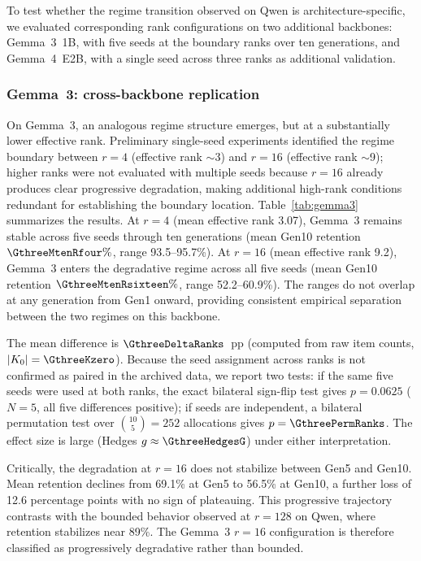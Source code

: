 \documentclass[a4paper,fleqn]{cas-dc}
\newif\ifshowchanges
\newcommand{\rev}[1]{\ifshowchanges{\color{blue}#1}\else{#1}\fi}
\begin{document}
To test whether the regime transition observed on Qwen is architecture-specific,
we evaluated corresponding rank configurations on two additional backbones:
Gemma~3~1B, with five seeds at the boundary ranks over ten generations, and
Gemma~4~E2B, with a single seed across three ranks as additional validation.

\subsubsection{Gemma~3: cross-backbone replication}

On Gemma~3, an analogous regime structure emerges, but at a substantially lower
effective rank. Preliminary single-seed experiments identified the regime
boundary between $r=4$ (effective rank ${\sim}$3) and $r=16$ (effective rank
${\sim}$9); higher ranks were not evaluated with multiple seeds because $r=16$
already produces clear progressive degradation, making additional high-rank
conditions redundant for establishing the boundary location.
Table~\ref{tab:gemma3} summarizes the results. At $r=4$ (mean
effective rank 3.07), Gemma~3 remains stable across five seeds through ten
generations (mean Gen10 retention \rev{$\GthreeMtenRfour\%$, range 93.5--95.7\%}).
At $r=16$ (mean effective rank 9.2), Gemma~3 enters the degradative regime
across all five seeds (mean Gen10 retention \rev{$\GthreeMtenRsixteen\%$,
range 52.2--60.9\%}). The ranges do not
overlap at any generation from Gen1 onward, providing consistent empirical
separation between the two regimes on this backbone.

\rev{The mean difference is $\GthreeDeltaRanks$~pp (computed from raw item counts,
$|K_0|=\GthreeKzero$). Because the seed assignment across ranks is not confirmed
as paired in the archived data, we report two tests: if the same five seeds were
used at both ranks, the exact bilateral sign-flip test gives $p=0.0625$
($N=5$, all five differences positive); if seeds are independent, a bilateral
permutation test over $\binom{10}{5}=252$ allocations gives
$p=\GthreePermRanks$. The effect size is large (Hedges $g \approx \GthreeHedgesG$)
under either interpretation.}

Critically, the degradation at $r=16$ does not stabilize between Gen5 and
Gen10. Mean retention declines from 69.1\% at Gen5 to 56.5\% at Gen10, a
further loss of 12.6 percentage points with no sign of plateauing. This
progressive trajectory contrasts with the bounded behavior observed at $r=128$
on Qwen, where retention stabilizes near 89\%. The Gemma~3 $r=16$
configuration is therefore classified as progressively degradative rather than
bounded.
\end{document}
